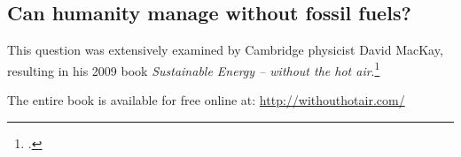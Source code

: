 	
	
	\subsection{Can humanity manage without fossil fuels?}
	


This question was extensively examined by Cambridge physicist David MacKay, resulting in his 2009 book \emph{Sustainable Energy – without the hot air}.\footcite[][]{MacKay2009}


The entire book is available for free online at: \url{http://withouthotair.com/}


